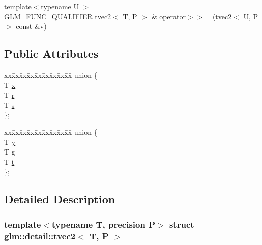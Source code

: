 \begin{DoxyCompactItemize}
\item 
{\footnotesize template$<$typename U $>$ }\\\hyperlink{setup_8hpp_a33fdea6f91c5f834105f7415e2a64407}{G\+L\+M\+\_\+\+F\+U\+N\+C\+\_\+\+Q\+U\+A\+L\+I\+F\+I\+ER} \hyperlink{structglm_1_1detail_1_1tvec2}{tvec2}$<$ T, P $>$ \& \hyperlink{structglm_1_1detail_1_1tvec2_afbc6fa3075b872f1a10c5ad97e08b012}{operator$>$$>$=} (\hyperlink{structglm_1_1detail_1_1tvec2}{tvec2}$<$ U, P $>$ const \&v)
\end{DoxyCompactItemize}
\subsection*{Public Attributes}
\begin{DoxyCompactItemize}
\item 
\begin{tabbing}
xx\=xx\=xx\=xx\=xx\=xx\=xx\=xx\=xx\=\kill
union \{\\
\>T \hyperlink{structglm_1_1detail_1_1tvec2_a8eaf23d68c8d88949166dc2f641d19ba}{x}\\
\>T \hyperlink{structglm_1_1detail_1_1tvec2_a48526371c2978bcc09ee8121f9babd83}{r}\\
\>T \hyperlink{structglm_1_1detail_1_1tvec2_a6d602cf7c31b75396944d828ad2aea72}{s}\\
\}; \\

\end{tabbing}\item 
\begin{tabbing}
xx\=xx\=xx\=xx\=xx\=xx\=xx\=xx\=xx\=\kill
union \{\\
\>T \hyperlink{structglm_1_1detail_1_1tvec2_ab30528ab747cef8d129cf793aeec521a}{y}\\
\>T \hyperlink{structglm_1_1detail_1_1tvec2_a31ec73176d013596e098adebc33d80f1}{g}\\
\>T \hyperlink{structglm_1_1detail_1_1tvec2_a3bc5274a5a076043a6c972c6806bd203}{t}\\
\}; \\

\end{tabbing}\end{DoxyCompactItemize}


\subsection{Detailed Description}
\subsubsection*{template$<$typename T, precision P$>$\newline
struct glm\+::detail\+::tvec2$<$ T, P $>$}



